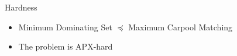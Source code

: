 \begin{frame}{Hardness}
\begin{itemize}
  \item Minimum Dominating Set $\preceq$ Maximum Carpool Matching
  \item The problem is APX-hard
\end{itemize}

\vfill

\centering


\end{frame}